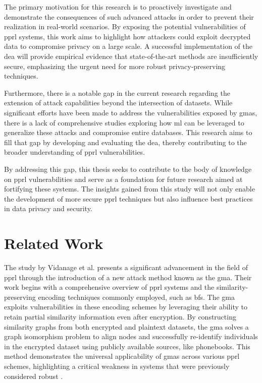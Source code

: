 The primary motivation for this research is to proactively investigate and demonstrate the consequences of such advanced attacks in order to prevent their realization in real-world scenarios. 
By exposing the potential vulnerabilities of \ac{pprl} systems, this work aims to highlight how attackers could exploit decrypted data to compromise privacy on a large scale. 
A successful implementation of the \ac{dea} will provide empirical evidence that state-of-the-art methods are insufficiently secure, emphasizing the urgent need for more robust privacy-preserving techniques.

Furthermore, there is a notable gap in the current research regarding the extension of attack capabilities beyond the intersection of datasets. 
While significant efforts have been made to address the vulnerabilities exposed by \ac{gma}s, there is a lack of comprehensive studies exploring how \ac{ml} can be leveraged to generalize these attacks and compromise entire databases. 
This research aims to fill that gap by developing and evaluating the \ac{dea}, thereby contributing to the broader understanding of \ac{pprl} vulnerabilities.

By addressing this gap, this thesis seeks to contribute to the body of knowledge on \ac{pprl} vulnerabilities and serve as a foundation for future research aimed at fortifying these systems. 
The insights gained from this study will not only enable the development of more secure \ac{pprl} techniques but also influence best practices in data privacy and security.

\section{Related Work}  \label{sec:rel-work}

The study by Vidanage et al. \cite{vidanage2020graph} presents a significant advancement in the field of \ac{pprl} through the introduction of a new attack method known as the \ac{gma}. 
Their work begins with a comprehensive overview of \ac{pprl} systems and the similarity-preserving encoding techniques commonly employed, such as \ac{bf}s. 
The \ac{gma} exploits vulnerabilities in these encoding schemes by leveraging their ability to retain partial similarity information even after encryption. 
By constructing similarity graphs from both encrypted and plaintext datasets, the \ac{gma} solves a graph isomorphism problem to align nodes and successfully re-identify individuals in the encrypted dataset using publicly available sources, like phonebooks. 
This method demonstrates the universal applicability of \ac{gma}s across various \ac{pprl} schemes, highlighting a critical weakness in systems that were previously considered robust \cite{vidanage2020graph}.

